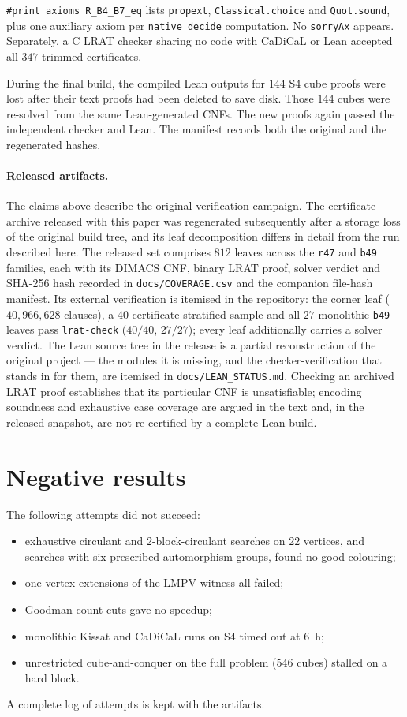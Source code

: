 \documentclass[11pt]{amsart}
\theoremstyle{definition}
\begin{document}
\texttt{\#print axioms R\_B4\_B7\_eq} lists \texttt{propext},
\texttt{Classical.choice} and \texttt{Quot.sound}, plus one auxiliary
axiom per \texttt{native\_decide} computation. No \texttt{sorryAx}
appears. Separately, a C LRAT checker sharing no code with CaDiCaL or
Lean accepted all $347$ trimmed certificates.

During the final build, the compiled Lean outputs for $144$ S4 cube
proofs were lost after their text proofs had been deleted to save
disk. Those $144$ cubes were re-solved from the same Lean-generated
CNFs. The new proofs again passed the independent checker and Lean.
The manifest records both the original and the regenerated hashes.

\paragraph{Released artifacts.} The claims above describe the original
verification campaign. The certificate archive released with this
paper was regenerated subsequently after a storage loss of the
original build tree, and its leaf decomposition differs in detail from
the run described here. The released set comprises $812$ leaves across
the \texttt{r47} and \texttt{b49} families, each with its DIMACS CNF,
binary LRAT proof, solver verdict and SHA-256 hash recorded in
\texttt{docs/COVERAGE.csv} and the companion file-hash manifest. Its
external verification is itemised in the repository: the corner leaf
($40{,}966{,}628$ clauses), a $40$-certificate stratified sample and
all $27$ monolithic \texttt{b49} leaves pass \texttt{lrat-check}
($40/40$, $27/27$); every leaf additionally carries a solver verdict.
The Lean source tree in the release is a partial reconstruction of the
original project — the modules it is missing, and the
checker-verification that stands in for them, are itemised in
\texttt{docs/LEAN\_STATUS.md}. Checking an archived LRAT proof
establishes that its particular CNF is unsatisfiable; encoding
soundness and exhaustive case coverage are argued in the text and, in
the released snapshot, are not re-certified by a complete Lean build.

\section{Negative results}

The following attempts did not succeed:
\begin{itemize}
\item exhaustive circulant and 2-block-circulant searches on $22$
vertices, and searches with six prescribed automorphism groups, found
no good colouring;
\item one-vertex extensions of the LMPV witness all failed;
\item Goodman-count cuts gave no speedup;
\item monolithic Kissat and CaDiCaL runs on S4 timed out at $6$~h;
\item unrestricted cube-and-conquer on the full problem ($546$ cubes)
stalled on a hard block.
\end{itemize}
A complete log of attempts is kept with the artifacts.
\end{document}
